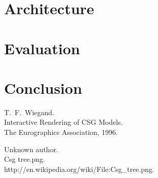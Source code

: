 \documentclass[a4paper,10pt,twoside]{report}
\begin{document}
\chapter{Architecture}

\chapter{Evaluation}

\chapter{Conclusion}


\begin{thebibliography}{99}
    T.~F.~Wiegand.\\
    Interactive Rendering of CSG Models.\\
    The Eurographics Association, 1996.
    
    Unknown author.\\
    Csg tree.png.\\
    http://en.wikipedia.org/wiki/File:Csg\_tree.png.\\
\end{thebibliography}
\end{document}

